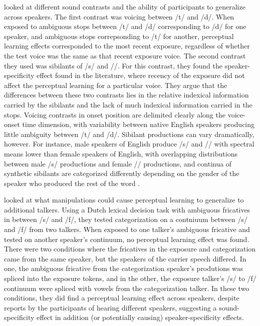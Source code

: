 \citet{Kraljic2007} looked at different sound contrasts and the ability of participants to generalize across speakers.  
The first contrast was voicing between /t/ and /d/.  
When exposed to ambiguous stops between /t/ and /d/ corresponding to /d/ for one speaker, and ambiguous stops correpsonding to /t/ for another, perceptual learning effects corresponded to the most recent exposure, regardless of whether the test voice was the same as that recent exposure voice.  
The second contrast they used was sibilants of /s/ and /\textesh/. 
For this contrast, they found the speaker-specificity effect found in the literature, where recency of the exposure did not affect the perceptual learning for a particular voice.
They argue that the differences between these two contrasts lies in the relative indexical information carried by the sibilants and the lack of much indexical information carried in the stops.
Voicing contrasts in onset position are delimited clearly along the voice-onset time dimension, with variability between native English speakers producing little ambiguity between /t/ and /d/.
Sibilant productions can vary dramatically, however.
For instance, male speakers of English produce /s/ and /\textesh/ with spectral means lower than female speakers of English, with overlapping distributions between male /s/ productions and female /\textesh/ productions, and continua of synthetic sibilants are categorized differently depending on the gender of the speaker who produced the rest of the word \citep{Strand1996}.  

\citet{Eisner2005} looked at what manipulations could cause perceptual learning to generalize to additional talkers.  
Using a Dutch lexical decision task with ambiguous fricatives in between /s/ and /f/, they tested categorization on a contniuum between /s/ and /f/ from two talkers.  
When exposed to one talker's ambiguous fricative and tested on another speaker's continuum, no perceptual learning effect was found.  
There were two conditions where the fricatives in the exposure and categorization came from the same speaker, but the speakers of the carrier speech differed.  
In one, the ambiguous fricative from the categorization speaker's produtions was spliced into the exposure tokens, and in the other, the exposure talker's /s/ to /f/ continuum were spliced with vowels from the categorization talker.
In these two conditions, they did find a perceptual learning effect across speakers, despite reports by the participants of hearing different speakers, suggesting a sound-specificity effect in addition (or potentially causing) speaker-specificity effects. 

